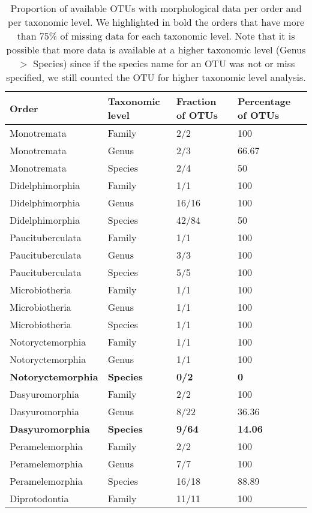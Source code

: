 \begin{longtable}{llll}
\caption{Proportion of available OTUs with morphological data per order and per taxonomic level. We highlighted in bold the orders that have more than 75\% of missing data for each taxonomic level. Note that it is possible that more data is available at a higher taxonomic level (Genus $>$ Species) since if the species name for an OTU was not or miss specified, we still counted the OTU for higher taxonomic level analysis.} \\ 
  \hline
Order & Taxonomic level & Fraction of OTUs & Percentage of OTUs \\ 
  \hline
Monotremata & Family & 2/2 & 100 \\ 
  Monotremata & Genus & 2/3 & 66.67 \\ 
  Monotremata & Species & 2/4 & 50 \\ 
  Didelphimorphia & Family & 1/1 & 100 \\ 
  Didelphimorphia & Genus & 16/16 & 100 \\ 
  Didelphimorphia & Species & 42/84 & 50 \\ 
  Paucituberculata & Family & 1/1 & 100 \\ 
  Paucituberculata & Genus & 3/3 & 100 \\ 
  Paucituberculata & Species & 5/5 & 100 \\ 
  Microbiotheria & Family & 1/1 & 100 \\ 
  Microbiotheria & Genus & 1/1 & 100 \\ 
  Microbiotheria & Species & 1/1 & 100 \\ 
  Notoryctemorphia & Family & 1/1 & 100 \\ 
  Notoryctemorphia & Genus & 1/1 & 100 \\ 
  \textbf{Notoryctemorphia} & \textbf{Species} & \textbf{0/2} & \textbf{0} \\ 
  Dasyuromorphia & Family & 2/2 & 100 \\ 
  Dasyuromorphia & Genus & 8/22 & 36.36 \\ 
  \textbf{Dasyuromorphia} & \textbf{Species} & \textbf{9/64} & \textbf{14.06} \\ 
  Peramelemorphia & Family & 2/2 & 100 \\ 
  Peramelemorphia & Genus & 7/7 & 100 \\ 
  Peramelemorphia & Species & 16/18 & 88.89 \\ 
  Diprotodontia & Family & 11/11 & 100 \\ 

\end{longtable}
